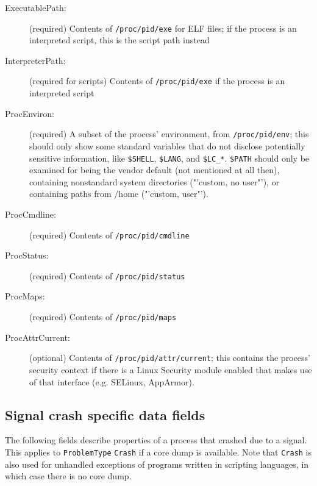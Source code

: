 \documentclass[DIV12,halfparskip]{scrartcl}
\begin{document}
\begin{description}
    \item [ExecutablePath:] (required) Contents of \verb!/proc/pid/exe! for ELF
    files; if the process is an interpreted script, this is the script path instead

    \item [InterpreterPath:] (required for scripts) Contents of
    \verb!/proc/pid/exe! if the process is an interpreted script

    \item [ProcEnviron:] (required) A subset of the process' environment, from
    \verb!/proc/pid/env!; this should only show some standard variables that do
    not disclose potentially sensitive information, like \verb!$SHELL!,
    \verb!$LANG!, and \verb!$LC_*!. \verb!$PATH! should only be examined for
    being the vendor default (not mentioned at all then), containing
    nonstandard system directories ("'custom, no user"'), or containing paths
    from /home ("'custom, user"').

    \item [ProcCmdline:] (required) Contents of \verb!/proc/pid/cmdline!

    \item [ProcStatus:] (required) Contents of \verb!/proc/pid/status!

    \item [ProcMaps:] (required) Contents of \verb!/proc/pid/maps!

    \item [ProcAttrCurrent:] (optional) Contents of
    \verb!/proc/pid/attr/current!; this contains the process' security
    context if there is a Linux Security module enabled that makes use
    of that interface (e.g. SELinux, AppArmor).

\end{description}

\subsection{Signal crash specific data fields}

The following fields describe properties of a process that crashed due to a
signal. This applies to \verb!ProblemType! \verb!Crash! if a core dump is
available. Note that \verb!Crash! is also used for unhandled exceptions of
programs written in scripting languages, in which case there is no core dump.
\end{document}
